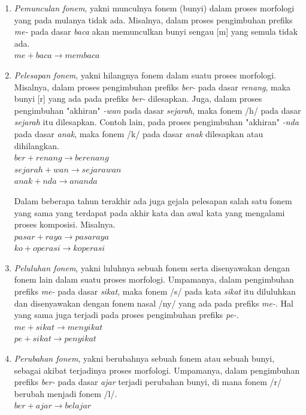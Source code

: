 \begin{enumerate}

	\item \textit{Pemunculan fonem}, yakni munculnya fonem (bunyi) dalam proses morfologi yang pada mulanya tidak ada. Misalnya, dalam proses pengimbuhan prefiks \textit{me-} pada dasar \textit{baca} akan memunculkan bunyi sengau [m] yang semula tidak ada.\\
	$me + baca \rightarrow membaca$
	
	\item \textit{Pelesapan fonem}, yakni hilangnya fonem dalam suatu proses morfologi. Misalnya, dalam proses pengimbuhan prefiks \textit{ber-} pada dasar \textit{renang}, maka bunyi [r] yang ada pada prefiks \textit{ber-} dilesapkan. Juga, dalam proses pengimbuhan "akhiran" \textit{-wan} pada dasar \textit{sejarah}, maka fonem /h/ pada dasar \textit{sejarah} itu dilesapkan. Contoh lain, pada proses pengimbuhan "akhiran" \textit{-nda} pada dasar \textit{anak}, maka fonem /k/ pada dasar \textit{anak} dilesapkan atau dihilangkan.\\
	$ber + renang \rightarrow berenang$\\
	$sejarah + wan \rightarrow sejarawan$\\
	$anak + nda \rightarrow ananda$
	
	Dalam beberapa tahun terakhir ada juga gejala pelesapan salah satu fonem yang sama yang terdapat pada akhir kata dan awal kata yang mengalami proses komposisi. Misalnya.\\
	$pasar + raya \rightarrow pasaraya$\\
	$ko + operasi \rightarrow koperasi$
	
	\item \textit{Peluluhan fonem}, yakni luluhnya sebuah fonem serta disenyawakan dengan fonem lain dalam suatu proses morfologi. Umpamanya, dalam pengimbuhan prefiks \textit{me-} pada dasar \textit{sikat}, maka fonem /s/ pada kata \textit{sikat} itu diluluhkan dan disenyawakan dengan fonem nasal /ny/ yang ada pada prefiks \textit{me-}. Hal yang sama juga terjadi pada proses pengimbuhan prefiks \textit{pe-}.\\
	$me + sikat \rightarrow menyikat$\\
	$pe + sikat \rightarrow penyikat$
	
	\item \textit{Perubahan fonem}, yakni berubahnya sebuah fonem atau sebuah bunyi, sebagai akibat terjadinya proses morfologi. Umpamanya, dalam pengimbuhan prefiks \textit{ber-} pada dasar \textit{ajar} terjadi perubahan bunyi, di mana fonem /r/ berubah menjadi fonem /l/.\\
	$ber + ajar \rightarrow belajar$

\end{enumerate}


